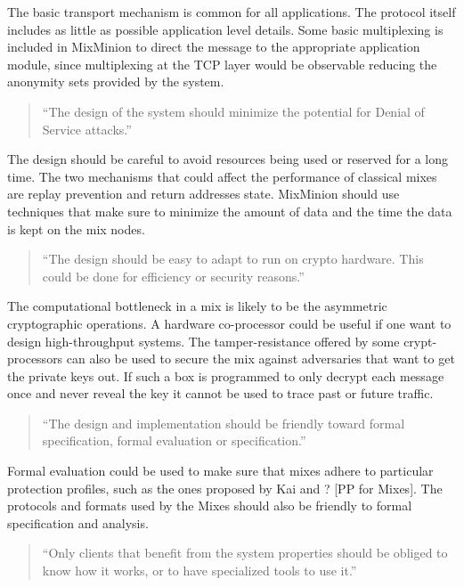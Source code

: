 \documentclass{article}
\begin{document}
The basic transport mechanism is common for all applications. The
protocol itself includes as little as possible application level
details. Some basic multiplexing is included in MixMinion to direct
the message to the appropriate application module, since multiplexing
at the TCP layer would be observable reducing the anonymity sets
provided by the system.

\begin{quote}
     ``The design of the system should minimize the potential for
     Denial of Service attacks.''
\end{quote}

The design should be careful to avoid resources being used or reserved
for a long time. The two mechanisms that could affect the performance
of classical mixes are replay prevention and return addresses
state. MixMinion should use techniques that make sure to minimize the
amount of data and the time the data is kept on the mix nodes. 

\begin{quote}
     ``The design should be easy to adapt to run on crypto
     hardware. This could be done for efficiency or security reasons.''
\end{quote}

The computational bottleneck in a mix is likely to be the asymmetric
cryptographic operations. A hardware co-processor could be useful if
one want to design high-throughput systems. The tamper-resistance
offered by some crypt-processors can also be used to secure the mix
against adversaries that want to get the private keys out. If such a
box is programmed to only decrypt each message once and never reveal
the key it cannot be used to trace past or future traffic.

\begin{quote}
     ``The design and implementation should be friendly toward formal
     specification, formal evaluation or specification.''
\end{quote}

Formal evaluation could be used to make sure that mixes adhere to
particular protection profiles, such as the ones proposed by Kai and ?
[PP for Mixes]. The protocols and formats used by the Mixes should
also be friendly to formal specification and analysis.

\begin{quote}
     ``Only clients that benefit from the system properties should be
     obliged to know how it works, or to have specialized tools to use
     it.''
\end{quote}
\end{document}
